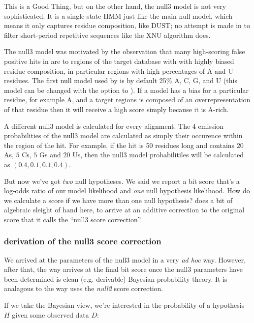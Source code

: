 This is a Good Thing, but on the other hand, the null3 model is not
very sophisticated. It is a single-state HMM just like the main null
model, which means it only captures residue composition, like DUST; no
attempt is made in  to filter short-period repetitive sequences
like the XNU algorithm does. 

The null3 model was motivated by the observation that many
high-scoring false positive hits in  are to regions of
the target database with with highly biased residue composition, in
particular regions with high percentages of A and U residues. The
first null model used by  is by default 25\% A, C,
G, and U (this model can be changed with the  option to
). If a model has a bias for a particular residue, for
example A,  and a target regions is composed of an overrepresentation
of that residue then it will receive a high score simply because it is
A-rich. 


A different null3 model is calculated for every alignment. The 4
emission probabilities of the null3 model are calculated as 
simply their occurence within the region of the hit. For example, if
the hit is 50 residues long and contains $20$ As, $5$ Cs, $5$ Gs and $20$ Us,
then the null3 model probabilitiles will be calculated as $(0.4, 0.1,
0.1, 0.4)$. 

But now we've got \emph{two} null hypotheses. We said we report a bit
score that's a log-odds ratio of our model likelihood and \emph{one}
null hypothesis likelihood. How do we calculate a score if we have
more than one null hypothesis?  does a bit of algebraic sleight
of hand here, to arrive at an additive correction to the original
score that it calls the ``null3 score correction''. 

\subsubsection{derivation of the null3 score correction}

We arrived at the parameters of the null3 model in a very \emph{ad
hoc} way. However, after that, the way  arrives at the final bit
score once the null3 parameters have been determined is clean
(e.g. derivable) Bayesian probability theory. It is analagous to the
way  uses the \emph{null2} score correction.

If we take the Bayesian view, we're interested in the probability of a
hypothesis $H$ given some observed data $D$:

